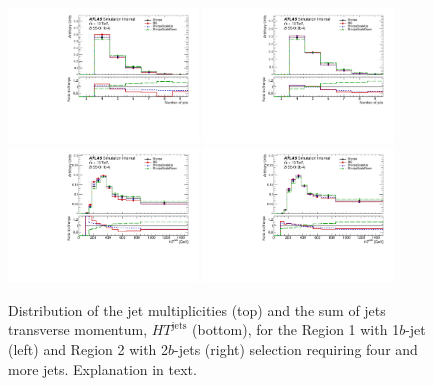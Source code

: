 \begin{figure}[!htb]
\centering
\includegraphics[width=0.45\textwidth]{Plots/ttV/shape/c_Region_0_nJets}
\includegraphics[width=0.45\textwidth]{Plots/ttV/shape/c_Region_1_nJets}\\
\includegraphics[width=0.45\textwidth]{Plots/ttV/shape/c_Region_0_HT_jets}
\includegraphics[width=0.45\textwidth]{Plots/ttV/shape/c_Region_1_HT_jets}\\
  \caption{Distribution of the jet multiplicities (top) and the sum of jets transverse momentum, $HT^{\text{jets}}$ (bottom), for the Region 1 with 1$b$-jet (left) and Region 2 with 2$b$-jets (right) selection requiring four and more jets. Explanation in text. \label{ttV:4j12b}}
\end{figure}


